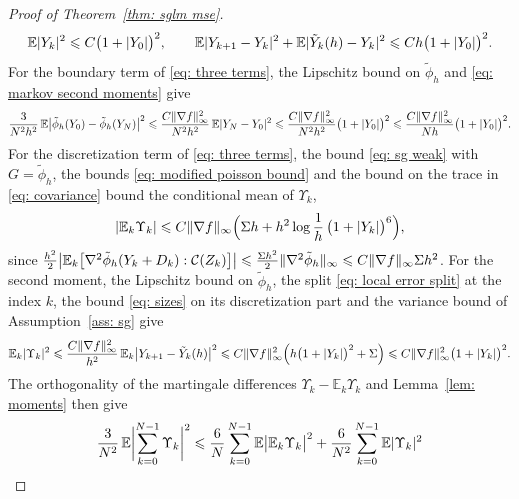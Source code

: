 \begin{proof}[Proof of Theorem~\ref{thm: sglm mse}]
    \begin{equation}
        \mathbb E|Y_k|^2 \leqslant C \bigl( 1+|Y_0| \bigr)^2 , \qquad \mathbb E|Y_{k+1} - Y_k|^2 + \mathbb E|\tilde Y_k(h) - Y_k|^2 \leqslant C h \bigl( 1+|Y_0| \bigr)^2 .
        \label{eq: markov second moments}
    \end{equation}
    For the boundary term of \eqref{eq: three terms}, the Lipschitz bound on $\tilde\phi_h$ and \eqref{eq: markov second moments} give
    \begin{equation}
        \frac{3}{N^2h^2}\, \mathbb E\bigl| \tilde\phi_h(Y_0) - \tilde\phi_h(Y_N) \bigr|^2 \leqslant \frac{C \lVert \nabla f \rVert_\infty^2}{N^2h^2}\, \mathbb E|Y_N - Y_0|^2 \leqslant \frac{C \lVert \nabla f \rVert_\infty^2}{N^2 h^2} \bigl( 1+|Y_0| \bigr)^2 \leqslant \frac{C \lVert \nabla f \rVert_\infty^2}{Nh} \bigl( 1+|Y_0| \bigr)^2 .
    \label{eq: boundary term bound}
    \end{equation}
    For the discretization term of \eqref{eq: three terms}, the bound \eqref{eq: sg weak} with $G = \tilde\phi_h$, the bounds \eqref{eq: modified poisson bound} and the bound on the trace in \eqref{eq: covariance} bound the conditional mean of $\Upsilon_k$,
    \begin{equation*}
        |\mathbb E_k \Upsilon_k| \leqslant C \lVert \nabla f \rVert_\infty \Bigl( \Sigma h + h^2 \log\frac1h\, \bigl( 1+|Y_k| \bigr)^6 \Bigr) ,
    \end{equation*}
    since $\frac{h^2}{2} \bigl| \mathbb E_k\bigl[ \nabla^2 \tilde\phi_h(Y_k + D_k) : \mathcal C(Z_k) \bigr] \bigr| \leqslant \frac{\Sigma h^2}{2} \lVert \nabla^2 \tilde\phi_h \rVert_\infty \leqslant C \lVert \nabla f \rVert_\infty \Sigma h^2$. For the second moment, the Lipschitz bound on $\tilde\phi_h$, the split \eqref{eq: local error split} at the index $k$, the bound \eqref{eq: sizes} on its discretization part and the variance bound of Assumption~\ref{ass: sg} give
    \begin{equation*}
        \mathbb E_k |\Upsilon_k|^2 \leqslant \frac{C \lVert \nabla f \rVert_\infty^2}{h^2}\, \mathbb E_k \bigl| Y_{k+1} - \tilde Y_k(h) \bigr|^2 \leqslant C \lVert \nabla f \rVert_\infty^2 \Bigl( h \bigl( 1+|Y_k| \bigr)^2 + \Sigma \Bigr) \leqslant C \lVert \nabla f \rVert_\infty^2 \bigl( 1+|Y_k| \bigr)^2 .
    \end{equation*}
    The orthogonality of the martingale differences $\Upsilon_k - \mathbb E_k \Upsilon_k$ and Lemma~\ref{lem: moments} then give
    \begin{equation}
    \begin{aligned}
        \frac{3}{N^2}\, \mathbb E\biggl| \sum_{k=0}^{N-1} \Upsilon_k \biggr|^2 & \Le \frac6N \sum_{k=0}^{N-1} \mathbb E\bigl| \mathbb E_k \Upsilon_k \bigr|^2 + \frac{6}{N^2} \sum_{k=0}^{N-1} \mathbb E|\Upsilon_k|^2 \\

\end{aligned}
\end{equation}
\end{proof}
